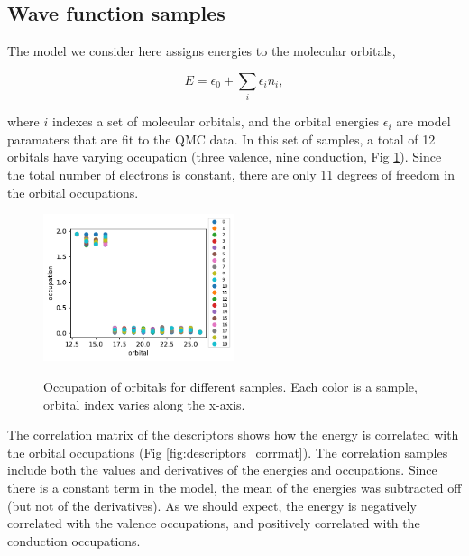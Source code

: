 \subsection{Wave function samples}

The model we consider here assigns energies to the molecular orbitals,

\begin{equation}
E = \epsilon_0 + \sum_i \epsilon_i n_i,
\end{equation}

where $i$ indexes a set of molecular orbitals, and the orbital energies $\epsilon_i$ are model paramaters that are fit to the QMC data.
In this set of samples, a total of 12 orbitals have varying occupation (three valence, nine conduction, Fig \ref{fig:descriptors}).
Since the total number of electrons is constant, there are only 11 degrees of freedom in the orbital occupations.

\begin{figure}[h!]
\includegraphics[width=0.5\textwidth]{images/dmc_lowen_descriptors.pdf}
\label{fig:descriptors}
\caption{Occupation of orbitals for different samples. Each color is a sample, orbital index varies along the x-axis.}
\end{figure}

The correlation matrix of the descriptors shows how the energy is correlated with the orbital occupations (Fig \ref{fig:descriptors_corrmat}).
The correlation samples include both the values and derivatives of the energies and occupations.
Since there is a constant term in the model, the mean of the energies was subtracted off (but not of the derivatives).
As we should expect, the energy is negatively correlated with the valence occupations, and positively correlated with the conduction occupations.

